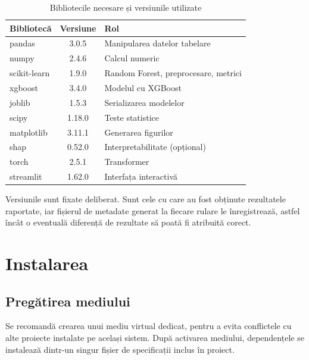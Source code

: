 \begin{table}[H]
    \caption{Bibliotecile necesare și versiunile utilizate}
    \centering
    \begin{tabular}{|l|c|p{4.0cm}|}
        \hline
        \textbf{Bibliotecă} & \textbf{Versiune} & \textbf{Rol} \\
        \hline
        pandas & 3.0.5 & Manipularea datelor tabelare \\
        \hline
        numpy & 2.4.6 & Calcul numeric \\
        \hline
        scikit-learn & 1.9.0 & Random Forest, preprocesare, metrici \\
        \hline
        xgboost & 3.4.0 & Modelul cu XGBoost \\
        \hline
        joblib & 1.5.3 & Serializarea modelelor \\
        \hline
        scipy & 1.18.0 & Teste statistice \\
        \hline
        matplotlib & 3.11.1 & Generarea figurilor \\
        \hline
        shap & 0.52.0 & Interpretabilitate (opțional) \\
        \hline
        torch & 2.5.1 & Transformer \\
        \hline
        streamlit & 1.62.0 & Interfața interactivă \\
        \hline
    \end{tabular}
    \label{tab:biblioteci}
\end{table}

Versiunile sunt fixate deliberat. Sunt cele cu care au fost obținute rezultatele raportate, iar fișierul de metadate generat la fiecare rulare le înregistrează, astfel încât o eventuală diferență de rezultate să poată fi atribuită corect.

\section{Instalarea}\label{sec:instalare}

\subsection{Pregătirea mediului}\label{subsec:mediu-instalare}

Se recomandă crearea unui mediu virtual dedicat, pentru a evita conflictele cu alte proiecte instalate pe același sistem. După activarea mediului, dependențele se instalează dintr-un singur fișier de specificații inclus în proiect.

